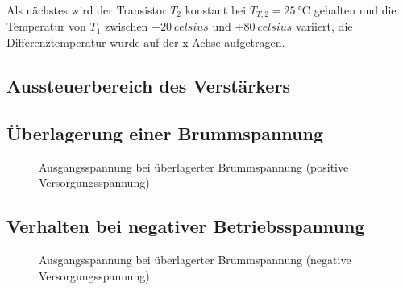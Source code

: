 
Als nächstes wird der Transistor $T_2$ konstant bei $T_{T,2} = \SI{25}{\celsius}$ gehalten und die Temperatur von $T_1$ zwischen $-\SI{20}{celsius}$ und $+\SI{80}{celsius}$ variiert, die Differenztemperatur wurde auf der x-Achse aufgetragen.


\subsection{Aussteuerbereich des Verstärkers}


\subsection{Überlagerung einer Brummspannung}

\begin{figure}[H]
	\centering \small
	\scalebox{0.9}{}
	\caption{Ausgangsspannung bei überlagerter Brummspannung (positive Versorgungsspannung)}
	\label{fig_Kap5_11:Brumm}
\end{figure}

\subsection{Verhalten bei negativer Betriebsspannung}

\begin{figure}[H]
	\centering \small
	\scalebox{0.9}{}
	\caption{Ausgangsspannung bei überlagerter Brummspannung (negative Versorgungsspannung)}
	\label{fig_Kap5_12:Brumm}
\end{figure}


